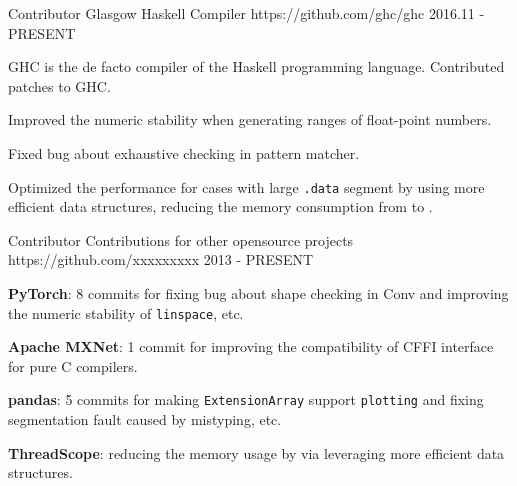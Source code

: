 \begin{cventries}
\vspace{-5mm}

\cventry
{Contributor} %
{Glasgow Haskell Compiler} %
{https://github.com/ghc/ghc} %
{2016.11 - PRESENT} %
{ %
    \begin{cvitems}
        \item {GHC is the de facto compiler of the Haskell programming language. Contributed  patches to GHC.}
        \item {Improved the numeric stability when generating ranges of float-point numbers.}
        \item {Fixed bug about exhaustive checking in pattern matcher.}
        \item {Optimized the performance for cases with large \texttt{.data} segment by using more efficient data structures, reducing the memory consumption from  to .}
    \end{cvitems}
}

\vspace{-5mm}

\cventry
{Contributor} %
{Contributions for other opensource projects} %
{https://github.com/xxxxxxxxx} %
{2013 - PRESENT} %
{ %
    \begin{cvitems}
        \item {\textbf{PyTorch}: 8 commits for fixing bug about shape checking in Conv and improving the numeric stability of \texttt{linspace}, etc.}
        \item {\textbf{Apache MXNet}: 1 commit for improving the compatibility of CFFI interface for pure C compilers.}
        \item {\textbf{pandas}: 5 commits for making \texttt{ExtensionArray} support \texttt{plotting} and fixing segmentation fault caused by mistyping, etc.}
        \item {\textbf{ThreadScope}: reducing the memory usage by  via leveraging more efficient data structures.}
    \end{cvitems}
}


\end{cventries}
